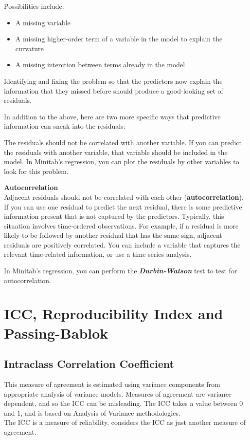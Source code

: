 \documentclass[12pt, a4paper]{report}
\theoremstyle{plain}
\theoremstyle{definition}
\theoremstyle{remark}
\begin{document}
	Possibilities include:
	
	\begin{itemize}
		\item A missing variable
		\item A missing higher-order term of a variable in the model to explain the curvature
		\item A missing interction between terms already in the model
	\end{itemize}
	
	
	Identifying and fixing the problem so that the predictors now explain the information that they missed before should produce a good-looking set of residuals.
	
	In addition to the above, here are two more specific ways that predictive information can sneak into the residuals:
	
	The residuals should not be correlated with another variable. If you can predict the residuals with another variable, that variable should be included in the model. In Minitab’s regression, you can plot the residuals by other variables to look for this problem.
	
	\noindent \textbf{Autocorrelation} \\
	Adjacent residuals should not be correlated with each other (\textbf{autocorrelation}). If you can use one residual to predict the next residual, there is some predictive information present that is not captured by the predictors. Typically, this situation involves time-ordered observations. For example, if a residual is more likely to be followed by another residual that has the same sign, adjacent residuals are positively correlated. You can include a variable that captures the relevant time-related information, or use a time series analysis. 
	
	In Minitab’s regression, you can perform the \textbf{\textit{Durbin-Watson} }test to test for autocorrelation.
	

	\section{ICC, Reproducibility Index and Passing-Bablok }
	
	
	\subsection{Intraclass Correlation Coefficient} This measure of agreement is estimated using variance components from appropriate analysis of variance models. Measures of agreement are variance dependent, and so the ICC can be misleading. The ICC takes a value between $0$ and $1$, and is based on Analysis of Variance
	methodologies.
	\\
	The ICC is a measure of reliability. \citet{bartko} considers the ICC as just another measure of agreement.
	
\end{document}
